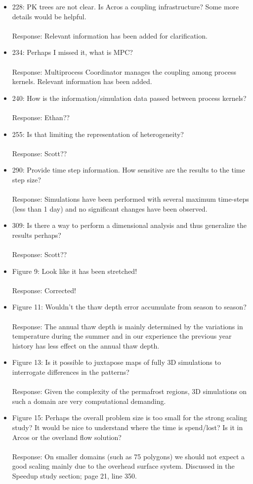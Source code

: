 \documentclass[12pt]{article}\usepackage{amsmath, amssymb, graphicx, array}
\begin{document}
\begin{itemize}

\item 228: PK trees are not clear. Is Acros a coupling infrastructure? Some more details would be helpful. \\ \\
Response: Relevant information has been added for clarification.
\item 234: Perhaps I missed it, what is MPC? \\ \\ 
Response: Multiprocess Coordinator manages the coupling among process kernels. Relevant information has been added.
\item 240: How is the information/simulation data passed between process kernels? \\ \\
Response:  Ethan??
\item 255: Is that limiting the representation of heterogeneity? \\ \\
Response: Scott??
\item 290: Provide time step information. How sensitive are the results to the time step size? \\ \\
Response:  Simulations have been performed with several maximum time-steps (less than 1 day) and no significant changes have been observed.
\item 309: Is there a way to perform a dimensional analysis and thus generalize the results perhaps? \\ \\
Response: Scott??
\item Figure 9: Look like it has been stretched! \\ \\
Response: Corrected!
\item Figure 11: Wouldn't the thaw depth error accumulate from season to season? \\ \\
Response: The annual thaw depth is mainly determined by the variations in temperature during the summer and in our experience the previous year history has less effect on the annual thaw depth. 
\item Figure 13: Is it possible to juxtapose maps of fully 3D simulations to interrogate differences in the patterns? \\ \\
Response: Given the complexity of the permafrost regions, 3D simulations on such a domain are very computational demanding.
\item Figure 15: Perhaps the overall problem size is too small for the strong scaling study? It would be nice to understand where the time is spend/lost? Is it in Arcos or the overland flow solution? \\ \\ 
Response: On smaller domains (such as 75 polygons) we should not expect a good scaling mainly due to the overhead surface system. Discussed in the Speedup study section; page 21, line 350.
\end{itemize}
\end{document}
